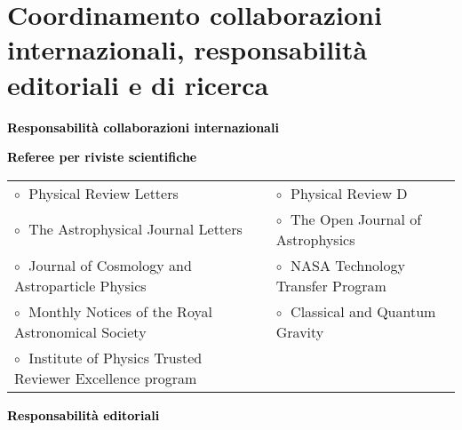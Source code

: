 \vspace{-0.1cm}

\vspace{-0.1cm}

\vspace{0.2cm}

\section{Coordinamento collaborazioni internazionali, responsabilità editoriali e di ricerca}

\textbf{\textcolor{black}{Responsabilità collaborazioni internazionali}}
\vspace{0.1cm}



\textbf{\textcolor{black}{Referee per riviste scientifiche}}
\vspace{0.1cm}

\begin{tabular}{@{\hskip 0.4cm}l@{\hskip 0.4in}l}
$\circ\;$ Physical Review Letters & $\circ\;$ Physical Review D \\
$\circ\;$ The Astrophysical Journal Letters  &  $\circ\;$  The Open Journal of Astrophysics  \\
$\circ\;$ Journal of Cosmology and Astroparticle Physics & $\circ\;$ NASA Technology Transfer Program \\
$\circ\;$ Monthly Notices of the Royal Astronomical Society& $\circ\;$ Classical and Quantum Gravity\\
$\circ\;$ Institute of Physics Trusted Reviewer Excellence program \\
\end{tabular}

\vspace{0.2cm}
\textbf{\textcolor{black}{Responsabilità editoriali}}
\vspace{0.1cm}


